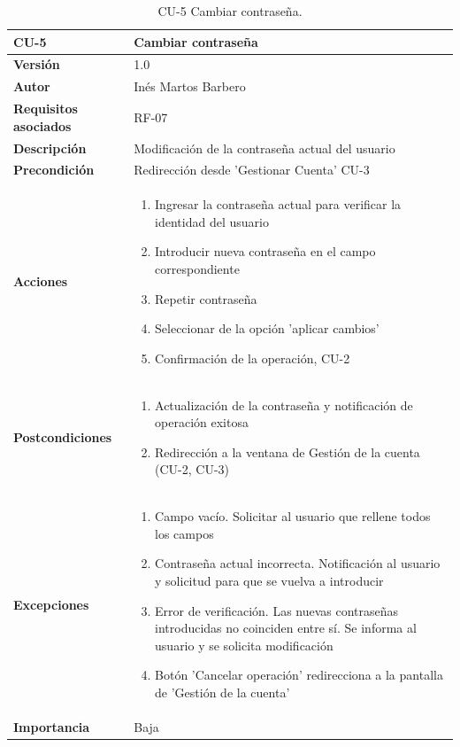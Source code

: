 \begin{table}[p]
	\centering
	\begin{tabularx}{\linewidth}{ p{} p{} }
		\toprule
		\textbf{CU-5}    & \textbf{Cambiar contraseña}\\
		\toprule
		\textbf{Versión}              & 1.0    \\
		\textbf{Autor}                & Inés Martos Barbero \\
		\textbf{Requisitos asociados} & RF-07 \\
		\textbf{Descripción}          & Modificación de la contraseña actual del usuario \\
		\textbf{Precondición}         & Redirección desde 'Gestionar Cuenta' CU-3 \\
		\textbf{Acciones}             &
		\begin{enumerate}
			\def\labelenumi{\arabic{enumi}.}
			\tightlist
			\item Ingresar la contraseña actual para verificar la identidad del usuario
                \item Introducir nueva contraseña en el campo correspondiente
                \item Repetir contraseña
			\item Seleccionar de la opción 'aplicar cambios'
                \item Confirmación de la operación, CU-2
		\end{enumerate}\\
		\textbf{Postcondiciones}        &
		\begin{enumerate}
			\def\labelenumi{\arabic{enumi}.}
			\tightlist
			\item Actualización de la contraseña y notificación de operación exitosa
                \item Redirección a la ventana de Gestión de la cuenta (CU-2, CU-3)
		\end{enumerate}\\
		\textbf{Excepciones}          & 
            \begin{enumerate}
			\def\labelenumi{\arabic{enumi}.}
			\tightlist
			\item Campo vacío. Solicitar al usuario que rellene todos los campos
                \item Contraseña actual incorrecta. Notificación al usuario y solicitud para que se vuelva a introducir
                \item Error de verificación. Las nuevas contraseñas introducidas no coinciden entre sí. Se informa al usuario y se solicita modificación
                \item Botón 'Cancelar operación' redirecciona a la pantalla de 'Gestión de la cuenta'
		\end{enumerate}\\
		\textbf{Importancia}          & Baja \\
		\bottomrule
	\end{tabularx}
	\caption{CU-5 Cambiar contraseña.}
\end{table}


